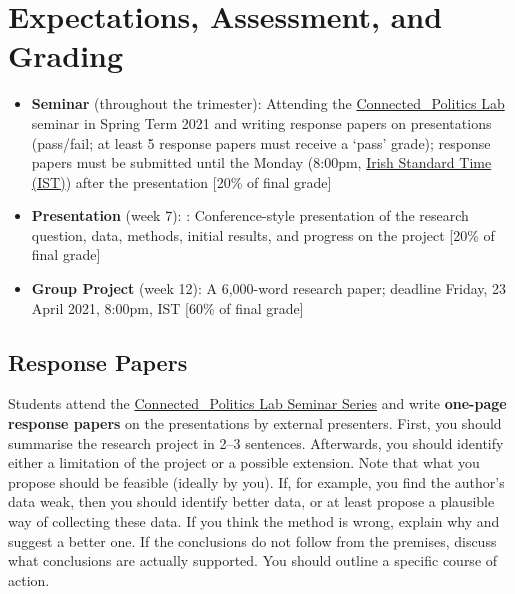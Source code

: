 \documentclass[abstract=on,parskip=full,headings=standardclasses,fontsize=11pt,paper=a4]{scrartcl}
\begin{document}
\section*{Expectations, Assessment, and Grading}


\begin{itemize}
\item \textbf{Seminar} (throughout the trimester): Attending the \href{https://www.ucd.ie/connected_politics/events/}{Connected\_Politics Lab} seminar in Spring Term 2021 and writing response papers on presentations (pass/fail; at least 5 response papers must receive a `pass'  grade); response papers must be submitted until the Monday (8:00pm, \href{https://www.timeanddate.com/time/zones/ist-ireland}{Irish Standard Time (IST)}) after  the presentation [20\% of final grade]
\item \textbf{Presentation} (week 7): : Conference-style presentation of the research question, data, methods, initial results, and progress on the project  [20\% of final grade]
\item \textbf{Group Project} (week 12): A 6,000-word research paper; deadline Friday, 23 April 2021, 8:00pm, IST	  [60\% of final grade]
\end{itemize}




\subsection*{Response Papers}


Students attend the \href{https://www.ucd.ie/connected_politics/events/}{Connected\_Politics Lab Seminar Series} and write \textbf{one-page response papers} on the presentations by external presenters. First, you should summarise the research project in 2--3 sentences. Afterwards,  you should identify either a limitation of the project or a possible extension. Note that what you propose should be feasible (ideally by you). If, for example, you find the author's data weak, then you should identify better data, or at least propose a plausible way of collecting these data. If you think the method is wrong, explain why and suggest a better one. If the conclusions do not follow from the premises, discuss what conclusions are actually supported.  You should outline a specific course of action.  
 
\end{document}
